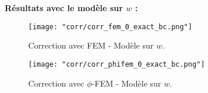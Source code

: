 \textbf{Résultats avec le modèle sur $w$ :}

\begin{minipage}{0.48\linewidth}
	\begin{figure}[H]
		\centering
		\texttt{[image: "corr/corr\_fem\_0\_exact\_bc.png"]}
		\caption{Correction avec FEM - Modèle sur $w$.}
		\label{corr_fem_0_exact_bc}
	\end{figure}
\end{minipage}
\begin{minipage}{0.48\linewidth}
	\begin{figure}[H]
		\centering
		\texttt{[image: "corr/corr\_phifem\_0\_exact\_bc.png"]}
		\caption{Correction avec $\phi$-FEM - Modèle sur $w$.}
		\label{corr_phifem_0_exact_bc}
	\end{figure}
\end{minipage}